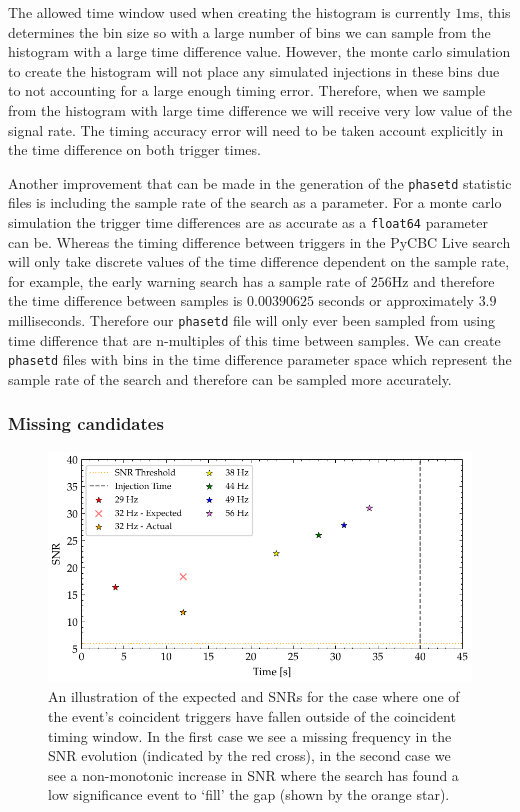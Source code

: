 The allowed time window used when creating the histogram is currently $1$ms, this determines the bin size so with a large number of bins we can sample from the histogram with a large time difference value. However, the monte carlo simulation to create the histogram will not place any simulated injections in these bins due to not accounting for a large enough timing error. Therefore, when we sample from the histogram with large time difference we will receive very low value of the signal rate. The timing accuracy error will need to be taken account explicitly in the time difference on both trigger times.

Another improvement that can be made in the generation of the \verb|phasetd| statistic files is including the sample rate of the search as a parameter. For a monte carlo simulation the trigger time differences are as accurate as a \verb|float64| parameter can be. Whereas the timing difference between triggers in the PyCBC Live search will only take discrete values of the time difference dependent on the sample rate, for example, the early warning search has a sample rate of $256$Hz and therefore the time difference between samples is $0.00390625$ seconds or approximately $3.9$ milliseconds. Therefore our \verb|phasetd| file will only ever been sampled from using time difference that are n-multiples of this time between samples. We can create \verb|phasetd| files with bins in the time difference parameter space which represent the sample rate of the search and therefore can be sampled more accurately.

\subsubsection{\label{6:sec:missing-cands}Missing candidates}
%
\begin{figure}
       \centering
    \includegraphics[width=\textwidth]{images/6_earlywarning/identified-problems/non_mono_snr.pdf}
    \caption{An illustration of the expected and SNRs for the case where one of the event's coincident triggers have fallen outside of the coincident timing window. In the first case we see a missing frequency in the SNR evolution (indicated by the red cross), in the second case we see a non-monotonic increase in SNR where the search has found a low significance event to `fill' the gap (shown by the orange star).}
    \label{6:fig:non-monotonic-snr}
\end{figure}
%

